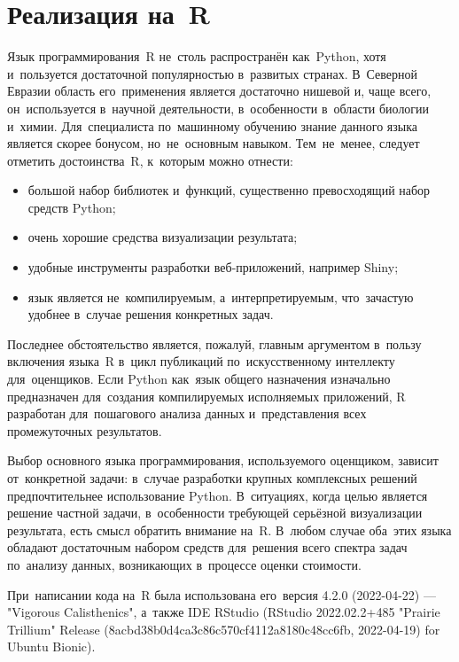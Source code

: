 \documentclass[]{scrreprt}
\begin{document}
\section{Реализация на~R}\label{U-test-R}
%
%
Язык программирования~R не~столь распространён как~Python, хотя и~пользуется достаточной популярностью в~развитых странах. В~Северной Евразии область его~применения является достаточно нишевой и, чаще всего, он~используется в~научной деятельности, в~особенности в~области биологии и~химии. Для~специалиста по~машинному обучению знание данного языка является скорее бонусом, но~не~основным навыком. Тем~не~менее, следует отметить достоинства~R, к~которым можно отнести:
\begin{itemize}
	\item большой набор библиотек и~функций, существенно превосходящий набор средств Python;
	\item очень хорошие средства визуализации результата;
	\item удобные инструменты разработки веб-приложений, например Shiny;
	\item язык является не~компилируемым, а~интерпретируемым, что~зачастую удобнее в~случае решения конкретных задач.
\end{itemize}
Последнее обстоятельство является, пожалуй, главным аргументом в~пользу включения языка~R в~цикл публикаций по~искусственному интеллекту для~оценщиков. Если Python как~язык общего назначения изначально предназначен для~создания компилируемых исполняемых приложений, R разработан для~пошагового анализа данных и~представления всех промежуточных результатов. 

Выбор основного языка программирования, используемого оценщиком, зависит от~конкретной задачи: в~случае разработки крупных комплексных решений предпочтительнее использование Python. В~ситуациях, когда целью является решение частной задачи, в~особенности требующей серьёзной визуализации результата, есть смысл обратить внимание на~R. В~любом случае оба~этих языка обладают достаточным набором средств для~решения всего спектра задач по~анализу данных, возникающих в~процессе оценки стоимости.

При~написании кода на~R была использована его~версия 4.2.0 (2022-04-22) \foreignlanguage{english}{--- "Vigorous Calisthenics"}, а~также \foreignlanguage{english}{IDE RStudio (RStudio 2022.02.2+485 "Prairie Trillium" Release (8acbd38b0d4ca3c86c570cf4112a8180c48cc6fb, 2022-04-19) for Ubuntu Bionic)}. 
\end{document}
